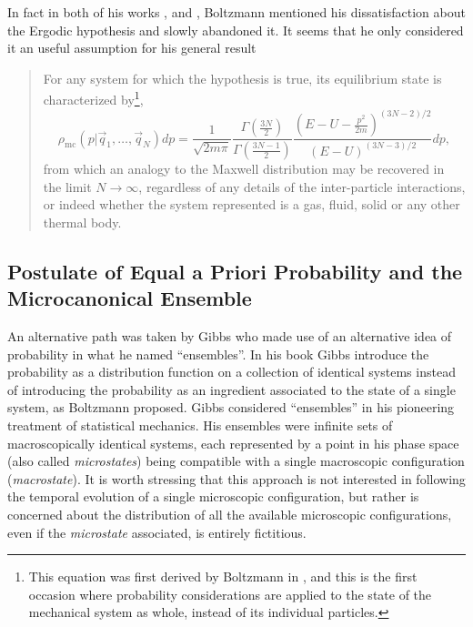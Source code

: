 \indent In fact in both of his works \cite{boltzmann_zur_1871}, and \cite{boltzmann_einige_1871}, Boltzmann mentioned his dissatisfaction about the Ergodic hypothesis and slowly abandoned it. It seems that he only considered it an useful assumption for his general result
\begin{quote}
For any system for which the hypothesis is true, its equilibrium state is characterized by\footnote{This equation was first derived by Boltzmann in \cite{boltzmann_uber_1866}, and this is the first occasion where probability considerations are applied to the state of the mechanical system as whole, instead of its individual particles.},
\begin{equation}
\rho_{\mathrm{mc}}\left(p | \vec{q}_{1}, \ldots, \vec{q}_{N}\right) d p=\frac{1}{\sqrt{2 m \pi}} \frac{\Gamma\left(\frac{3N}{2}\right)}{\Gamma\left(\frac{3N-1}{2}\right)} \frac{\left(E-U-\frac{p^{2}}{2 m}\right)^{(3N-2) / 2}}{(E-U)^{(3N-3) / 2}} d p,
\end{equation}
from which an analogy to the Maxwell distribution may be recovered in the limit $N \to \infty$, regardless of any details of the inter-particle interactions, or indeed whether the system represented is a gas, fluid, solid or any other thermal body.
\end{quote}

\subsection{Postulate of Equal a Priori Probability and the Microcanonical Ensemble}

An alternative path was taken by Gibbs who made use of an alternative idea of probability in what he named ``ensembles''. In his book \cite{gibbs_elementary_1902} Gibbs introduce the probability as a distribution function on a collection of identical systems instead of introducing the probability as an ingredient associated to the state of a single system, as Boltzmann proposed. Gibbs considered ``ensembles'' in his pioneering treatment of statistical mechanics. His ensembles were infinite sets of macroscopically identical systems, each represented  by a point in his phase space (also called \textit{microstates}) being compatible with a single macroscopic configuration (\textit{macrostate}). It is worth stressing that this approach is not interested in following the temporal evolution of a single microscopic configuration, but rather is concerned about the distribution of all the available microscopic configurations, even if the \textit{microstate} associated, is entirely fictitious.\\

